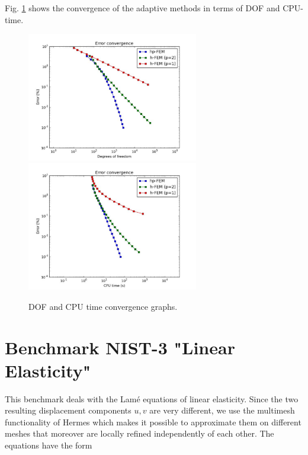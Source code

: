 \documentclass[12pt]{elsarticle}
\begin{document}
Fig. \ref{fig:nist-2-conv} shows the convergence of the adaptive methods in terms of DOF and CPU-time.

\begin{figure}[H]
\centering
\vspace{-3mm}
\hspace{-50mm}
\includegraphics[width=7.5cm]{mafig11.pdf}\ \
\hspace{-10mm}
\includegraphics[width=7.5cm]{mafig12.pdf}
\hspace{-50mm}
\vspace{-2mm}
\caption{DOF and CPU time convergence graphs.}
\label{fig:nist-2-conv}
\end{figure}


\section{Benchmark NIST-3 "Linear Elasticity"}
\label{sec:bench-3}

This benchmark deals with the Lam\'e equations of linear elasticity.
Since the two resulting displacement components $u, v$ are very different, we use the
multimesh functionality of Hermes \cite{label2,thermoel} which makes it
possible to approximate them on different meshes that moreover
are locally refined independently of each other.
The equations have the form
\vspace{-3mm}
\end{document}
